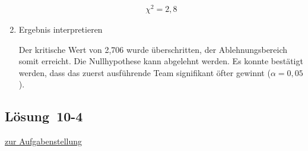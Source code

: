 \documentclass[
  11pt,
  ngerman,
  a4paper,
]{report}
\begin{document}
\begin{enumerate}
  \[\begin{aligned}
   \chi^2 = 2{,}8
   \end{aligned}\]
\item
  Ergebnis interpretieren

  Der kritische Wert von 2,706 wurde überschritten, der Ablehnungsbereich somit erreicht. Die Nullhypothese kann abgelehnt werden. Es konnte bestätigt werden, dass das zuerst ausführende Team signifikant öfter gewinnt (\(\alpha=0{,}05\)).
\end{enumerate}

\hypertarget{loesung-10-4}{%
\subsection{Lösung~10-4}\label{loesung-10-4}}

\protect\hyperlink{aufgabe-10-4}{zur Aufgabenstellung}
\end{document}
